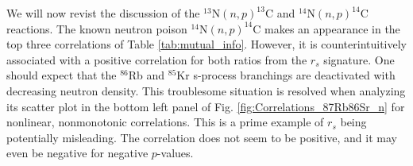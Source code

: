 We will now revist the discussion of the $^{13}\mathrm{N}(n,p)^{13}\mathrm{C}$ and $^{14}\mathrm{N}(n,p)^{14}\mathrm{C}$ reactions. The known neutron poison $^{14}\mathrm{N}(n,p)^{14}\mathrm{C}$ makes an appearance in the top three correlations of Table \ref{tab:mutual_info}. However, it is counterintuitively associated with a positive correlation for both ratios from the $r_{s}$ signature. One should expect that the $^{86}$Rb and $^{85}$Kr s-process branchings are deactivated with decreasing neutron density. This troublesome situation is resolved when analyzing its scatter plot in the bottom left panel of Fig. \ref{fig:Correlations_87Rb86Sr_n} for nonlinear, nonmonotonic correlations. This is a prime example of $r_{s}$ being potentially misleading. The correlation does not seem to be positive, and it may even be negative for negative $p$-values.

